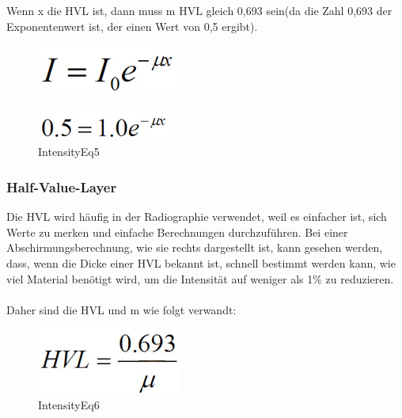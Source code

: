 Wenn x die HVL ist, dann muss m HVL gleich 0,693 sein(da die Zahl 0,693 der Exponentenwert ist, der einen Wert von 0,5 ergibt).

\begin{figure}[htb]
  \centering  
  \includegraphics[scale=0.5]{img/Die_Kurve_Formel.jpg}
\end{figure}

\begin{figure}[htb]
  \centering  
  \includegraphics[scale=0.5]{img/IntensityEq5.jpg}
  \caption{IntensityEq5}
  \label{fig:IntensityEq5}
\end{figure}

  \subsubsection{Half-Value-Layer}
Die HVL wird häufig in der Radiographie verwendet, weil es einfacher ist, sich Werte zu merken und einfache Berechnungen durchzuführen. Bei einer Abschirmungsberechnung, wie sie rechts dargestellt ist, kann gesehen werden, dass, wenn die Dicke einer HVL bekannt ist, schnell bestimmt werden kann, wie viel Material benötigt wird, um die Intensität auf weniger als 1\% zu reduzieren.\\
\\
Daher sind die HVL und m wie folgt verwandt:
\begin{figure}[htb]
\centering 
  \includegraphics[scale=0.5]{img/IntensityEq6.jpg}
  \caption{IntensityEq6}
  \label{fig:IntensityEq6}
  \end{figure}
